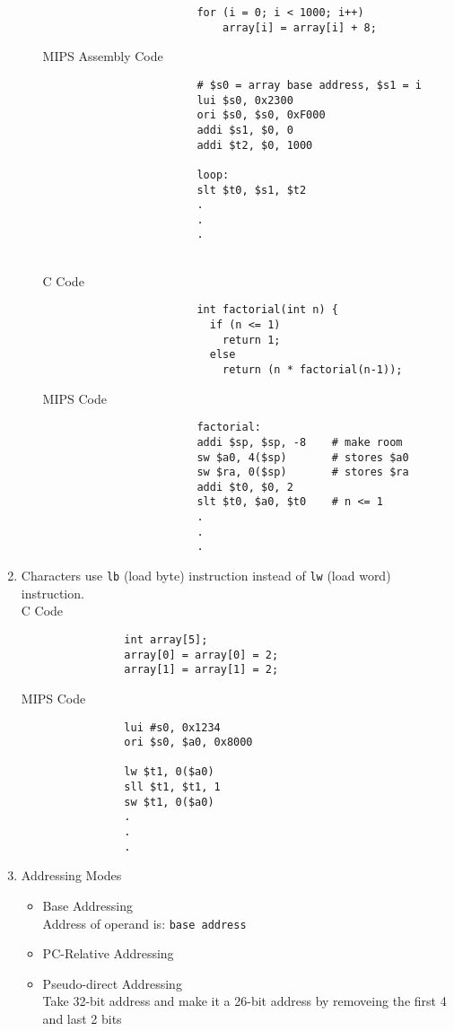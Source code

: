 \documentclass[a4paper]{article}
\begin{document}
\begin{enumerate}
\begin{itemize}
\begin{verbatim}
						for (i = 0; i < 1000; i++)
						    array[i] = array[i] + 8;
					\end{verbatim}
					MIPS Assembly Code
					\begin{verbatim}
						# $s0 = array base address, $s1 = i
						lui $s0, 0x2300
						ori $s0, $s0, 0xF000
						addi $s1, $0, 0
						addi $t2, $0, 1000

						loop:
						slt $t0, $s1, $t2
						.
						.
						.
					\end{verbatim}
					\\
					C Code
					\begin{verbatim}
						int factorial(int n) {
						  if (n <= 1)
						    return 1;
						  else
						    return (n * factorial(n-1));
					\end{verbatim}
					MIPS Code
					\begin{verbatim}
						factorial:
						addi $sp, $sp, -8    # make room
						sw $a0, 4($sp)       # stores $a0
						sw $ra, 0($sp)       # stores $ra
						addi $t0, $0, 2
						slt $t0, $a0, $t0    # n <= 1
						.
						.
						.
					\end{verbatim}

			\end{itemize}
		\item Characters use \verb+lb+ (load byte) instruction instead of
			\verb+lw+ (load word) instruction.\\
			C Code
			\begin{verbatim}
				int array[5];
				array[0] = array[0] = 2;
				array[1] = array[1] = 2;
			\end{verbatim}
			MIPS Code
			\begin{verbatim}
				lui #s0, 0x1234
				ori $s0, $a0, 0x8000

				lw $t1, 0($a0)
				sll $t1, $t1, 1
				sw $t1, 0($a0)
				.
				.
				.
			\end{verbatim}
		\item Addressing Modes
			\begin{itemize}
				\item Base Addressing\\
					Address of operand is: \verb+base address+
				\item PC-Relative Addressing
				\item Pseudo-direct Addressing\\
					Take 32-bit address and make it a 26-bit address by
					removeing the first 4 and last 2 bits
			\end{itemize}
	\end{enumerate}
	
\end{document}
